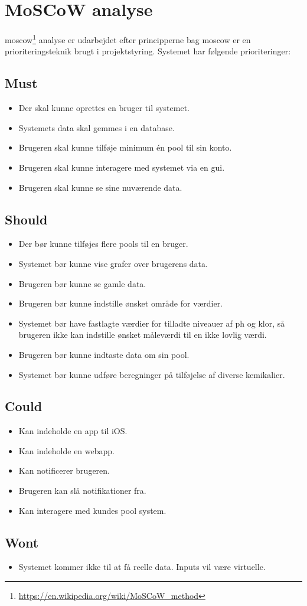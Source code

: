 \section{MoSCoW analyse}
\gls{moscow}\footnote{\url{https://en.wikipedia.org/wiki/MoSCoW_method}} analyse er udarbejdet efter principperne bag \gls{moscow} er en prioriteringsteknik brugt i projektstyring. Systemet har følgende prioriteringer:

\subsection*{Must}
\begin{itemize}
	\item Der skal kunne oprettes en bruger til systemet.
	\item Systemets data skal gemmes i en database.  
	\item Brugeren skal kunne tilføje minimum én pool til sin konto. 
	\item Brugeren skal kunne interagere med systemet via en \gls{gui}. 
	\item Brugeren skal kunne se sine nuværende data.
\end{itemize}

\subsection*{Should}
\begin{itemize}
	\item Der bør kunne tilføjes flere pools til en bruger. 
	\item Systemet bør kunne vise grafer over brugerens data.
	\item Brugeren bør kunne se gamle data.
	\item Brugeren bør kunne indstille ønsket område for værdier.
	\item Systemet bør have fastlagte værdier for tilladte niveauer af ph og klor, så brugeren ikke kan indstille ønsket måleværdi til en ikke lovlig værdi.
	\item Brugeren bør kunne indtaste data om sin pool.
	\item Systemet bør kunne udføre beregninger på tilføjelse af diverse kemikalier.
\end{itemize}

\subsection*{Could}
\begin{itemize}
	\item Kan indeholde en app til iOS.
	\item Kan indeholde en \gls{webapp}.
	\item Kan notificerer brugeren.
	\item Brugeren kan slå notifikationer fra.
	\item Kan interagere med kundes pool system.
\end{itemize}

\subsection*{Wont}
\begin{itemize}
	\item Systemet kommer ikke til at få reelle data. Inputs vil være virtuelle.
\end{itemize}
